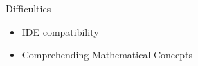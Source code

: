 \documentclass[final]{beamer}
\newlength{\sepwid}
\newlength{\onecolwid}
\newlength{\twocolwid}
\begin{document}
\begin{frame}
\begin{columns}[t]
\begin{column}{\twocolwid}
\begin{columns}[t,totalwidth=\twocolwid]
\begin{column}{\onecolwid}






\end{column} %

\end{columns} %

\end{column} %

\begin{column}{\sepwid}\end{column} %

\begin{column}{\onecolwid} %


\begin{exampleblock}{Difficulties}
\begin{itemize}
    \item IDE compatibility\cite{compatible}
    \item Comprehending Mathematical Concepts
\end{itemize}


\end{exampleblock}
\end{column}
\end{columns}
\end{frame}
\end{document}
